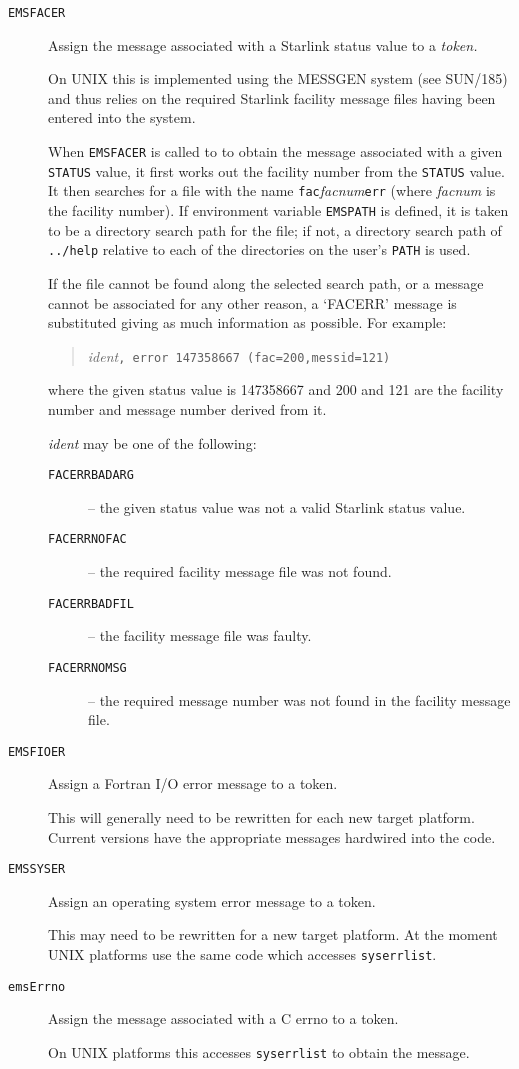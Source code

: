 \documentclass[twoside,11pt]{article}
\newcommand{\htmlref}[2]{#1}
\newcommand{\latex}[1]{#1}
\newcommand{\xref}[3]{#1}
\renewcommand{\_}{\texttt{\symbol{95}}}
\begin{document}
\begin {description}
\item [\htmlref{\texttt{EMS\_FACER}}{EMS_FACER}]  Assign the message
associated with a Starlink status value to a \textit{token.}

On UNIX this is implemented using the \xref{MESSGEN}{sun185}{} system
\latex{(see SUN/185)}
and thus relies on the required Starlink facility message files
having been entered into the system.

When \texttt{EMS\_FACER} is called to to obtain the message associated with a
given \texttt{STATUS} value, it first works out the facility number from the
\texttt{STATUS} value.
It then searches for a file with the name
\texttt{fac\_}\textit{facnum}\texttt{\_err} (where \textit{facnum} is the
facility number).
If environment variable \texttt{EMS\_PATH} is defined, it is taken to be a
directory search path for the file; 
if not, a directory search path of \texttt{../help} relative to each of the
directories on the user's \texttt{PATH} is used.

If the file cannot be found along the selected search path, or
a message cannot be associated for any other reason, a `FACERR' message is 
substituted giving as much information as possible. 
For example:
\begin{quote}
\textit{ident}\texttt{, error 147358667 (fac=200,messid=121)}
\end{quote}
where the given status value is 147358667 and 200 and 121 are the facility
number and message number derived from it.

\textit{ident} may be one of the following:
\begin{description}
\item[\texttt{FACERR\_\_BADARG}] --
the given status value was not a valid Starlink status value.
\item[\texttt{FACERR\_\_NOFAC}] --
the required facility message file was not found.
\item[\texttt{FACERR\_\_BADFIL}] -- 
the facility message file was faulty.
\item[\texttt{FACERR\_\_NOMSG}] -- 
the required message number was not found in the facility message file.
\end{description}
\item [\htmlref{\texttt{EMS\_FIOER}}{EMS_FIOER}]
Assign a Fortran I/O error message to a token.

This will generally need to be rewritten for each new target platform.
Current versions have the appropriate messages hardwired into the code.
\item [\htmlref{\texttt{EMS\_SYSER}}{EMS_SYSER}]  Assign an operating system
error message to a token.

This may need to be rewritten for a new target platform. At the
moment UNIX platforms use the same code which accesses \texttt{sys\_errlist}.
\item [\texttt{emsErrno}] Assign the message associated with a C errno to a
token.

On UNIX platforms this accesses \texttt{sys\_errlist} to obtain the message.
\end{description}
\end{document}
